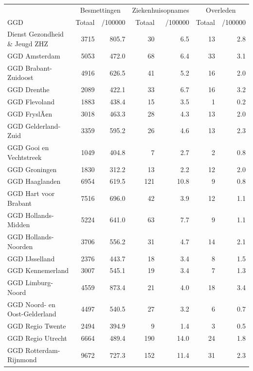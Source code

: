 \documentclass[
  english,
  man,floatsintext]{apa6}
\begin{document}
\begin{table}
\centering\begingroup\fontsize{10}{12}\selectfont

\begin{threeparttable}
\begin{tabular}{lrrrrrr}
\toprule
\multicolumn{1}{c}{ } & \multicolumn{2}{c}{Besmettingen} & \multicolumn{2}{c}{Ziekenhuisopnames} & \multicolumn{2}{c}{Overleden} \\
\cmidrule(l{3pt}r{3pt}){2-3} \cmidrule(l{3pt}r{3pt}){4-5} \cmidrule(l{3pt}r{3pt}){6-7}
GGD & Totaal & /100000 & Totaal & /100000 & Totaal & /100000\\
\midrule
Dienst Gezondheid \& Jeugd ZHZ & 3715 & 805.7 & 30 & 6.5 & 13 & 2.8\\
GGD Amsterdam & 5053 & 472.0 & 68 & 6.4 & 33 & 3.1\\
GGD Brabant-Zuidoost & 4916 & 626.5 & 41 & 5.2 & 16 & 2.0\\
GGD Drenthe & 2089 & 422.1 & 33 & 6.7 & 16 & 3.2\\
GGD Flevoland & 1883 & 438.4 & 15 & 3.5 & 1 & 0.2\\
GGD FryslÃ¢n & 3018 & 463.3 & 28 & 4.3 & 13 & 2.0\\
GGD Gelderland-Zuid & 3359 & 595.2 & 26 & 4.6 & 13 & 2.3\\
GGD Gooi en Vechtstreek & 1049 & 404.8 & 7 & 2.7 & 2 & 0.8\\
GGD Groningen & 1830 & 312.2 & 13 & 2.2 & 12 & 2.0\\
GGD Haaglanden & 6954 & 619.5 & 121 & 10.8 & 9 & 0.8\\
GGD Hart voor Brabant & 7516 & 696.0 & 42 & 3.9 & 12 & 1.1\\
GGD Hollands-Midden & 5224 & 641.0 & 63 & 7.7 & 9 & 1.1\\
GGD Hollands-Noorden & 3706 & 556.2 & 31 & 4.7 & 14 & 2.1\\
GGD IJsselland & 2376 & 443.7 & 18 & 3.4 & 8 & 1.5\\
GGD Kennemerland & 3007 & 545.1 & 19 & 3.4 & 7 & 1.3\\
GGD Limburg-Noord & 4559 & 873.4 & 21 & 4.0 & 18 & 3.4\\
GGD Noord- en Oost-Gelderland & 4497 & 540.5 & 27 & 3.2 & 6 & 0.7\\
GGD Regio Twente & 2494 & 394.9 & 9 & 1.4 & 3 & 0.5\\
GGD Regio Utrecht & 6664 & 489.4 & 190 & 14.0 & 24 & 1.8\\
GGD Rotterdam-Rijnmond & 9672 & 727.3 & 152 & 11.4 & 31 & 2.3\\

\end{tabular}
\end{threeparttable}
\end{table}
\end{document}
